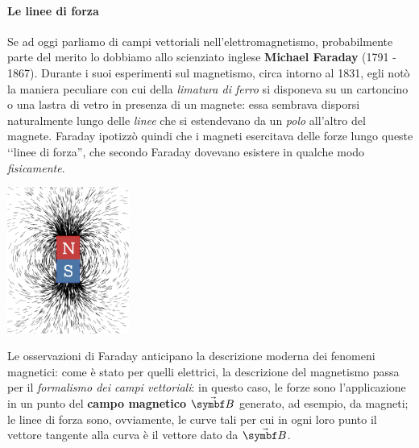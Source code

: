 \paragraph{Le linee di forza}
Se ad oggi parliamo di campi vettoriali nell'elettromagnetismo, probabilmente parte del merito lo dobbiamo allo scienziato inglese \textbf{Michael Faraday} (1791 - 1867). Durante i suoi esperimenti sul magnetismo, circa intorno al 1831, egli notò la maniera peculiare con cui della \textit{limatura di ferro} si disponeva su un cartoncino o una lastra di vetro in presenza di un magnete: essa sembrava disporsi naturalmente lungo delle \textit{linee} che si estendevano da un \textit{polo} all'altro del magnete. Faraday ipotizzò quindi che i magneti esercitava delle forze lungo queste ‘‘linee di forza'', che secondo Faraday dovevano esistere in qualche modo \textit{fisicamente}.
\begin{center}
	\includegraphics[width=0.3\textwidth]{images/chp7/chp7faradayfilatura.pdf}
\end{center}
Le osservazioni di Faraday anticipano la descrizione moderna dei fenomeni magnetici: come è stato per quelli elettrici, la descrizione del magnetismo passa per il \textit{formalismo dei campi vettoriali}: in questo caso, le forze sono l'applicazione in un punto del \textbf{campo magnetico} $\vba{B}$ generato, ad esempio, da magneti; le linee di forza sono, ovviamente, le curve tali per cui in ogni loro punto il vettore tangente alla curva è il vettore dato da $\vba{B}$.
